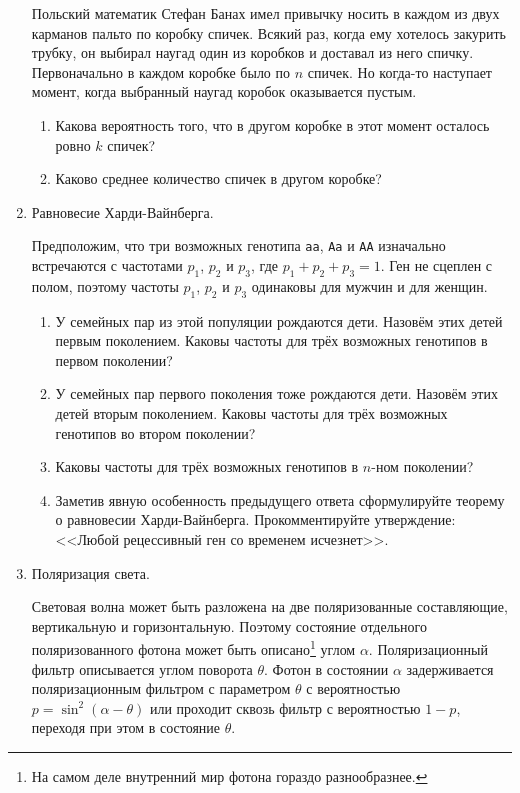 \documentclass[12pt,a4paper]{article}
\begin{document}
\begin{enumerate}
Польский математик Стефан Банах имел привычку носить в каждом из двух карманов пальто по коробку спичек. Всякий раз, когда ему хотелось закурить трубку, он выбирал наугад один из коробков и доставал из него спичку. Первоначально в каждом коробке было по $n$ спичек. Но когда-то наступает момент, когда выбранный наугад коробок оказывается пустым.

\begin{enumerate}
\item Какова вероятность того, что в другом коробке в этот момент осталось ровно $k$ спичек?
\item Каково среднее количество спичек в другом коробке?
\end{enumerate}


\item Равновесие Харди-Вайнберга. 

Предположим, что три возможных генотипа \verb|aa|, \verb|Aa| и \verb|AA| изначально встречаются с частотами $p_1$, $p_2$ и $p_3$, где $p_1+p_2+p_3=1$. Ген не сцеплен с полом, поэтому частоты $p_1$, $p_2$ и $p_3$ одинаковы для мужчин и для женщин. 
\begin{enumerate}
\item У семейных пар из этой популяции рождаются дети. Назовём этих детей первым поколением. Каковы частоты для трёх возможных генотипов в первом поколении? 
\item У семейных пар первого поколения тоже рождаются дети. Назовём этих детей вторым поколением. Каковы частоты для трёх возможных генотипов во втором поколении? 
\item Каковы частоты для трёх возможных генотипов в $n$-ном поколении?
\item Заметив явную особенность предыдущего ответа сформулируйте теорему о равновесии Харди-Вайнберга. Прокомментируйте утверждение: <<Любой рецессивный ген со временем исчезнет>>.
\end{enumerate}

\item Поляризация света.

Световая волна может быть разложена на две поляризованные составляющие, вертикальную и горизонтальную. Поэтому состояние отдельного поляризованного фотона может быть описано\footnote{На самом деле внутренний мир фотона гораздо разнообразнее.} углом $\alpha$. Поляризационный фильтр описывается углом поворота $\theta$. Фотон в состоянии $\alpha$ задерживается поляризационным фильтром с параметром $\theta$ с вероятностью $p=\sin^2(\alpha-\theta)$ или проходит сквозь фильтр с вероятностью $1-p$, переходя при этом в состояние $\theta$. 


\end{enumerate}
\end{document}
